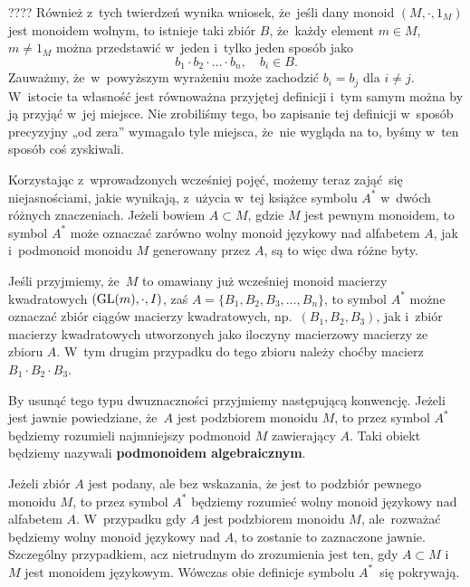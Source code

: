 \documentclass[a4paper,11pt]{article}
\begin{document}
???? Również z~tych twierdzeń wynika wniosek, że~jeśli dany monoid
$( M, \cdot, 1_{ M } )$ jest monoidem wolnym, to istnieje taki zbiór
$B$, że~każdy element $m \in M$, $m \neq 1_{ M }$ można przedstawić
w~jeden i~tylko jeden sposób jako
\begin{equation}
  \label{eq:Forys-Forys-04}
  b_{ 1 } \cdot b_{ 2 } \cdot \ldots \cdot b_{ n }, \quad
  b_{ i } \in B.
\end{equation}
Zauważmy, że~w~powyższym wyrażeniu może zachodzić $b_{ i } = b_{ j }$
dla $i \neq j$. W~istocie ta własność jest równoważna przyjętej
definicji i~tym samym można by ją przyjąć w~jej miejsce. Nie
zrobiliśmy tego, bo zapisanie tej definicji w~sposób precyzyjny „od
zera” wymagało tyle miejsca, że~nie wygląda na to, byśmy w~ten sposób
coś zyskiwali.

\vspace{\spaceFour}



\start {} Korzystając z~wprowadzonych wcześniej pojęć, możemy
teraz zająć~się niejasnościami, jakie wynikają, z~użycia w~tej książce
symbolu $A^{ * }$ w~dwóch różnych znaczeniach. Jeżeli bowiem
$A \subset M$, gdzie $M$ jest pewnym monoidem, to symbol $A^{ * }$
może oznaczać zarówno wolny monoid językowy nad alfabetem $A$, jak
i~podmonoid monoidu $M$ generowany przez $A$, są to więc dwa różne
byty.

Jeśli przyjmiemy, że~$M$ to omawiany już wcześniej monoid macierzy
kwadratowych $( \mathrm{GL}( m ), \cdot, I )$, zaś
$A = \{ B_{ 1 }, B_{ 2 }, B_{ 3 }, \ldots, B_{ n } \}$, to symbol
$A^{ * }$ możne oznaczać zbiór ciągów macierzy kwadratowych,
np.~$( B_{ 1 }, B_{ 2 }, B_{ 3 } )$, jak i~zbiór macierzy kwadratowych
utworzonych jako iloczyny macierzowy macierzy ze zbioru $A$. W~tym
drugim przypadku do tego zbioru należy choćby macierz
$B_{ 1 } \cdot B_{ 2 } \cdot B_{ 3 }$.

By usunąć tego typu dwuznaczności przyjmiemy następującą konwencję.
Jeżeli jest jawnie powiedziane, że~$A$ jest podzbiorem monoidu $M$, to
przez symbol $A^{ * }$ będziemy rozumieli najmniejszy podmonoid $M$
zawierający $A$. Taki obiekt będziemy nazywali \textbf{podmonoidem
  algebraicznym}.

Jeżeli zbiór $A$ jest podany, ale bez wskazania, że
jest to podzbiór pewnego monoidu $M$, to przez symbol $A^{ * }$
będziemy rozumieć wolny monoid językowy nad alfabetem $A$. W~przypadku
gdy $A$ jest podzbiorem monoidu $M$, ale~rozważać będziemy wolny
monoid językowy nad $A$, to zostanie to zaznaczone jawnie. Szczególny
przypadkiem, acz nietrudnym do zrozumienia jest ten, gdy $A \subset M$
i~$M$ jest monoidem językowym. Wówczas obie definicje symbolu
$A^{ * }$~się pokrywają.
\end{document}
